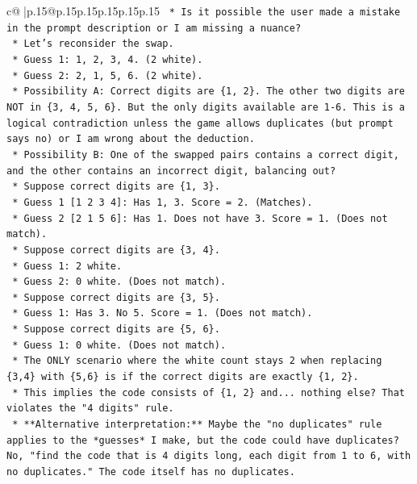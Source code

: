 \documentclass{article}
\begin{document}
{\begin{supertabular}{c@{$\;$}|p{.15\linewidth}@{}p{.15\linewidth}p{.15\linewidth}p{.15\linewidth}p{.15\linewidth}p{.15\linewidth}}
{{{\texttt{    *   Is it possible the user made a mistake in the prompt description or I am missing a nuance?} \\
\texttt{    *   Let's reconsider the swap.} \\
\texttt{    *   Guess 1: 1, 2, 3, 4. (2 white).} \\
\texttt{    *   Guess 2: 2, 1, 5, 6. (2 white).} \\
\texttt{    *   Possibility A: Correct digits are \{1, 2\}. The other two digits are NOT in \{3, 4, 5, 6\}. But the only digits available are 1{-}6. This is a logical contradiction unless the game allows duplicates (but prompt says no) or I am wrong about the deduction.} \\
\texttt{    *   Possibility B: One of the swapped pairs contains a correct digit, and the other contains an incorrect digit, balancing out?} \\
\texttt{        *   Suppose correct digits are \{1, 3\}.} \\
\texttt{        *   Guess 1 {[}1 2 3 4{]}: Has 1, 3. Score = 2. (Matches).} \\
\texttt{        *   Guess 2 {[}2 1 5 6{]}: Has 1. Does not have 3. Score = 1. (Does not match).} \\
\texttt{        *   Suppose correct digits are \{3, 4\}.} \\
\texttt{        *   Guess 1: 2 white.} \\
\texttt{        *   Guess 2: 0 white. (Does not match).} \\
\texttt{        *   Suppose correct digits are \{3, 5\}.} \\
\texttt{        *   Guess 1: Has 3. No 5. Score = 1. (Does not match).} \\
\texttt{        *   Suppose correct digits are \{5, 6\}.} \\
\texttt{        *   Guess 1: 0 white. (Does not match).} \\
\texttt{    *   The ONLY scenario where the white count stays 2 when replacing \{3,4\} with \{5,6\} is if the correct digits are exactly \{1, 2\}.} \\
\texttt{    *   This implies the code consists of \{1, 2\} and... nothing else? That violates the "4 digits" rule.} \\
\texttt{    *   **Alternative interpretation:** Maybe the "no duplicates" rule applies to the *guesses* I make, but the code could have duplicates? No, "find the code that is 4 digits long, each digit from 1 to 6, with no duplicates." The code itself has no duplicates.} \\
}}}
\end{supertabular}}
\end{document}
